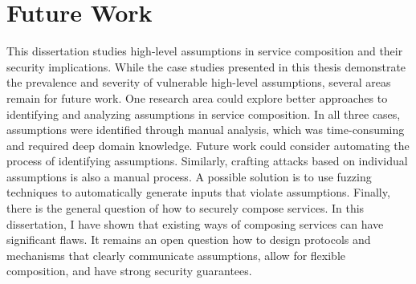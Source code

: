 \section{Future Work}
This dissertation studies high-level assumptions in service composition and their security implications. While the case studies presented in this thesis demonstrate the prevalence and severity of vulnerable high-level assumptions, several areas remain for future work. One research area could explore better approaches to identifying and analyzing assumptions in service composition. In all three cases, assumptions were identified through manual analysis, which was time-consuming and required deep domain knowledge. Future work could consider automating the process of identifying assumptions. Similarly, crafting attacks based on individual assumptions is also a manual process. A possible solution is to use fuzzing techniques to automatically generate inputs that violate assumptions. Finally, there is the general question of how to securely compose services. In this dissertation, I have shown that existing ways of composing services can have significant flaws. It remains an open question how to design protocols and mechanisms that clearly communicate assumptions, allow for flexible composition, and have strong security guarantees.

